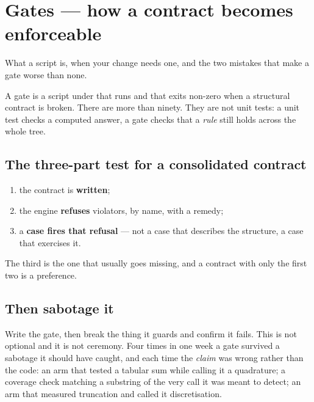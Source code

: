 \documentclass[11pt,a4paper]{article}
\begin{document}
\section{Gates --- how a contract becomes enforceable}
\label{sec:gates}

\begin{whatyoulllearn}
What a  script is, when your change needs one, and the two
mistakes that make a gate worse than none.
\end{whatyoulllearn}

A gate is a script under  that  runs and
that exits non-zero when a structural contract is broken. There are more than
ninety. They are not unit tests: a unit test checks a computed answer, a gate
checks that a \emph{rule} still holds across the whole tree.

\subsection{The three-part test for a consolidated contract}

\begin{enumerate}[leftmargin=*]
  \item the contract is \textbf{written};
  \item the engine \textbf{refuses} violators, by name, with a remedy;
  \item a \textbf{case fires that refusal} --- not a case that describes the
        structure, a case that exercises it.
\end{enumerate}

The third is the one that usually goes missing, and a contract with only the
first two is a preference.

\subsection{Then sabotage it}

Write the gate, then break the thing it guards and confirm it fails. This is
not optional and it is not ceremony. Four times in one week a gate survived a
sabotage it should have caught, and each time the \emph{claim} was wrong
rather than the code: an arm that tested a tabular sum while calling it a
quadrature; a coverage check matching a substring of the very call it was
meant to detect; an arm that measured truncation and called it discretisation.
\end{document}
